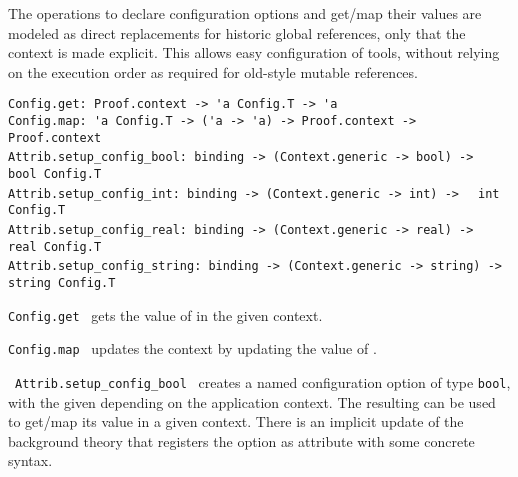 \begin{isabellebody}
\begin{isamarkuptext}
  The operations to declare configuration options and get/map their
  values are modeled as direct replacements for historic global
  references, only that the context is made explicit.  This allows
  easy configuration of tools, without relying on the execution order
  as required for old-style mutable references.%
\end{isamarkuptext}%
\isamarkuptrue%
%
\isadelimmlref
%
\endisadelimmlref
%
\isatagmlref
%
\begin{isamarkuptext}%
\begin{mldecls}
  \verb|Config.get: Proof.context -> 'a Config.T -> 'a| \\
  \verb|Config.map: 'a Config.T -> ('a -> 'a) -> Proof.context -> Proof.context| \\
  \verb|Attrib.setup_config_bool: binding -> (Context.generic -> bool) ->|\isasep\isanewline%
\verb|  bool Config.T| \\
  \verb|Attrib.setup_config_int: binding -> (Context.generic -> int) ->|\isasep\isanewline%
\verb|  int Config.T| \\
  \verb|Attrib.setup_config_real: binding -> (Context.generic -> real) ->|\isasep\isanewline%
\verb|  real Config.T| \\
  \verb|Attrib.setup_config_string: binding -> (Context.generic -> string) ->|\isasep\isanewline%
\verb|  string Config.T| \\
  \end{mldecls}

  \begin{description}

  \item \verb|Config.get|~ gets the value of
   in the given context.

  \item \verb|Config.map|~ updates the context
  by updating the value of .

  \item {}~\verb|Attrib.setup_config_bool|~ creates a named configuration option of type \verb|bool|, with the given  depending on the application
  context.  The resulting  can be used to get/map its
  value in a given context.  There is an implicit update of the
  background theory that registers the option as attribute with some
  concrete syntax.


\end{description}
\end{isamarkuptext}
\end{isabellebody}
